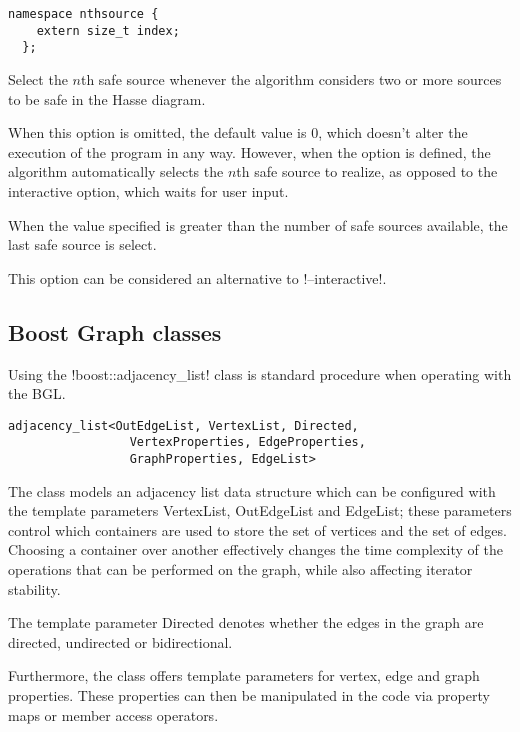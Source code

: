 \begin{lstlisting}[style=c++_block, aboveskip=\smallskipamount]
  namespace nthsource {
    extern size_t index;
  };
\end{lstlisting}

Select the $n$th safe source whenever the algorithm considers two or more sources to be safe in the Hasse diagram.

When this option is omitted, the default value is 0, which doesn't alter the execution of the program in any way.
However, when the option is defined, the algorithm automatically selects the $n$th safe source to realize, as opposed to the interactive option, which waits for user input.

When the value specified is greater than the number of safe sources available, the last safe source is select.

This option can be considered an alternative to !--interactive!.

\subsection{Boost Graph classes}\label{section:graph-classes}

\lstset{style=c++_block}

Using the !boost::adjacency_list! class is standard procedure when operating with the BGL.

\begin{lstlisting}[style=code_block, basicstyle=\footnotesize\ttfamily\bfseries\color{block_fg}]
  adjacency_list<OutEdgeList, VertexList, Directed,
                 VertexProperties, EdgeProperties,
                 GraphProperties, EdgeList>
\end{lstlisting}

The class models an adjacency list data structure which can be configured with the template parameters VertexList, OutEdgeList and EdgeList; these parameters control which containers are used to store the set of vertices and the set of edges.
Choosing a container over another effectively changes the time complexity of the operations that can be performed on the graph, while also affecting iterator stability.

The template parameter Directed denotes whether the edges in the graph are directed, undirected or bidirectional.

Furthermore, the class offers template parameters for vertex, edge and graph properties.
These properties can then be manipulated in the code via property maps or member access operators.

